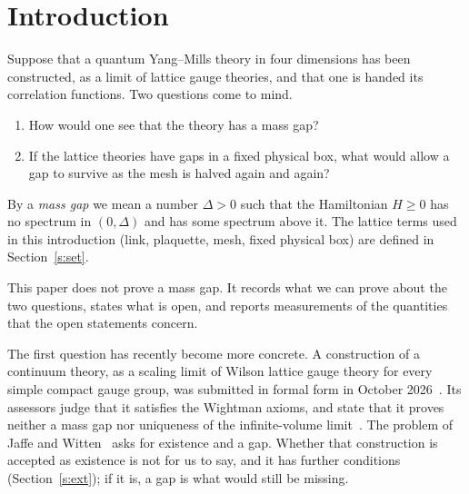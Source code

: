 
\begin{abstract}
Suppose a Yang--Mills theory is known only through its correlation functions. How could a mass gap be
recognised in it, and what would let a gap survive when a lattice is refined? For the first question we prove
a spectral criterion. For the second we prove an inequality that reduces one refinement step to three
estimates, and we prove one of the three for $\SU(2)$. The other two are open, and so is a further condition
needed to chain the steps. No mass gap is proved.
\end{abstract}

\section{Introduction}\label{s:intro}

Suppose that a quantum Yang--Mills theory in four dimensions has been constructed, as a limit of lattice
gauge theories, and that one is handed its correlation functions. Two questions come to mind.
\begin{enumerate}
\item How would one see that the theory has a mass gap?
\item If the lattice theories have gaps in a fixed physical box, what would allow a gap to survive as the
mesh is halved again and again?
\end{enumerate}
By a \emph{mass gap} we mean a number $\Delta>0$ such that the Hamiltonian $H\ge0$ has no spectrum in
$(0,\Delta)$ and has some spectrum above it. The lattice terms used in this introduction (link, plaquette,
mesh, fixed physical box) are defined in Section~\ref{s:set}.

This paper does not prove a mass gap. It records what we can prove about the two questions, states what is
open, and reports measurements of the quantities that the open statements concern.

The first question has recently become more concrete. A construction of a continuum theory, as a scaling
limit of Wilson lattice gauge theory for every simple compact gauge group, was submitted in formal form in
October 2026~\cite{OAI}. Its assessors judge that it satisfies the Wightman axioms, and state that it proves
neither a mass gap nor uniqueness of the infinite-volume limit~\cite[p.~1]{YMG}. The problem of Jaffe and
Witten~\cite[\S4]{JW} asks for existence and a gap. Whether that construction is accepted as existence is not
for us to say, and it has further conditions (Section~\ref{s:ext}); if it is, a gap is what would still be
missing.

